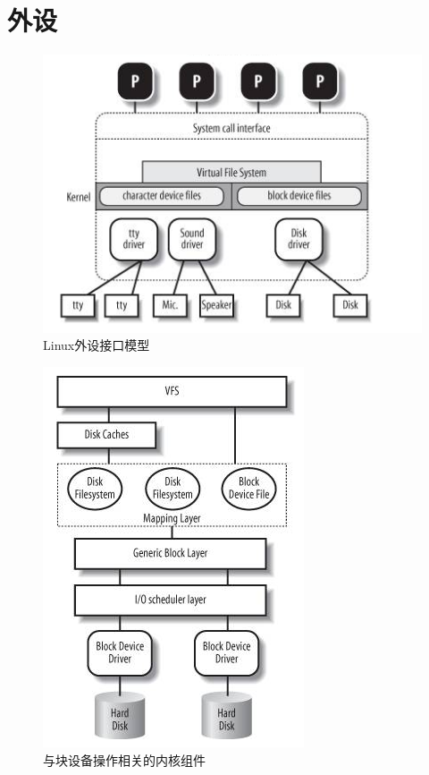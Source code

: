  
\section{外设}


\begin{figure}[ht]
	\begin{center}
		\includegraphics[keepaspectratio,width=0.5\paperwidth]{Pictures/Kernel/LinuxDriverInf.png}
	\caption{Linux外设接口模型}
	\label{fig:LinuxDriverInf}
	\end{center}
\end{figure}

\begin{figure}[ht]
	\begin{center}
		\includegraphics[keepaspectratio,width=0.4\paperwidth]{Pictures/Kernel/kernelComponentForBlockDeviceOp.png}
	\caption{与块设备操作相关的内核组件}
	\label{fig:kernelComponentForBlockDeviceOp}
	\end{center}
\end{figure}


